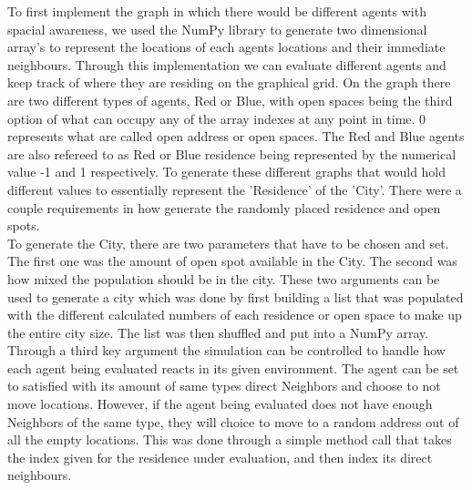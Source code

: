 \documentclass[letterpaper]{article}
\begin{document}
To first implement the graph in which there would be different agents with spacial awareness, we used the NumPy library to generate two dimensional array's to represent the locations of each agents locations and their immediate neighbours.  Through this implementation we can evaluate different agents and keep track of where they are residing on the graphical grid.  On the graph there are two different types of agents, Red or Blue, with open spaces being the third option of what can occupy any of the array indexes at any point in time.  0 represents what are called open address or open spaces. The Red and Blue agents are also refereed to as Red or Blue residence being represented by the numerical value -1 and 1 respectively.  To generate these different graphs that would hold different values to essentially represent the 'Residence' of the 'City'.  There were a couple requirements in how generate the randomly placed residence and open spots.\\
To generate the City, there are two parameters that have to be chosen and set. The first one was the amount of open spot available in the City.  The second was how mixed the population should be in the city.  These two arguments can be used to generate a city which was done by first building a list that was populated with the different calculated numbers of each residence or open space to make up the entire city size.  The list was then shuffled and put into a NumPy array. Through a third key argument the simulation can be controlled to handle how each agent being evaluated reacts in its given environment.  The agent can be set to satisfied with its amount of same types direct Neighbors and choose to not move locations.  However, if the agent being evaluated does not have enough Neighbors of the same type, they will choice to move to a random address out of all the empty locations.  This was done through a simple method call that takes the index given for the residence under evaluation, and then index its direct neighbours.\\\\
\end{document}
